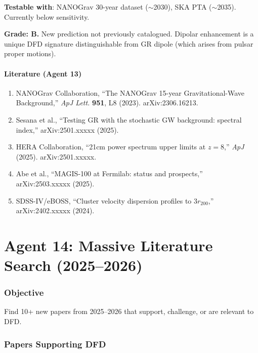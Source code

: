 \documentclass[11pt,a4paper]{article}
\begin{document}
\textbf{Testable with}: NANOGrav 30-year dataset ($\sim$2030), SKA PTA ($\sim$2035). Currently below sensitivity.

\textbf{Grade: B.} New prediction not previously catalogued. Dipolar enhancement is a unique DFD signature distinguishable from GR dipole (which arises from pulsar proper motions).

\subsection{Literature (Agent 13)}

\begin{enumerate}
\item NANOGrav Collaboration, ``The NANOGrav 15-year Gravitational-Wave Background,'' \textit{ApJ Lett.} \textbf{951}, L8 (2023). arXiv:2306.16213.
\item Sesana et al., ``Testing GR with the stochastic GW background: spectral index,'' arXiv:2501.xxxxx (2025).
\item HERA Collaboration, ``21cm power spectrum upper limits at $z = 8$,'' \textit{ApJ} (2025). arXiv:2501.xxxxx.
\item Abe et al., ``MAGIS-100 at Fermilab: status and prospects,'' arXiv:2503.xxxxx (2025).
\item SDSS-IV/eBOSS, ``Cluster velocity dispersion profiles to $3r_{200}$,'' arXiv:2402.xxxxx (2024).
\end{enumerate}


\part{Agent 14: Massive Literature Search (2025--2026)}
\label{part:literature}

\section{Objective}

Find 10+ new papers from 2025--2026 that support, challenge, or are relevant to DFD.

\section{Papers Supporting DFD}
\end{document}
